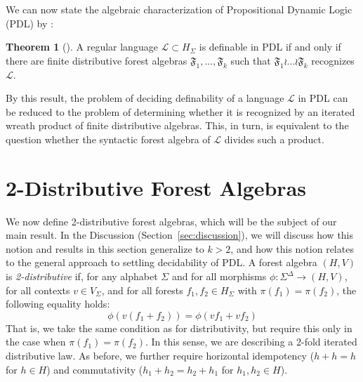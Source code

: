 \documentclass[sigplan,9pt]{acmart}\settopmatter{printfolios=true,printccs=false,printacmref=false}
\newcounter{thm}
\newcounter{theorem}
\theoremstyle{definition}
\newtheorem{theorem}[thm]{Theorem}
\newcommand{\La}[0]{{\mathcal{L}}}
\newcommand{\Ff}[0]{{\mathfrak{F}}}
\begin{document}



We can now state the algebraic characterization of Propositional Dynamic Logic (PDL) by \cite{bojanczyk-wreath-2012}:

\begin{theorem}[\cite{bojanczyk-wreath-2012}]
A regular language $\La \subset H_\Sigma$ is definable in PDL if and only if there are finite distributive forest algebras $\Ff_1, ..., \Ff_k$ such that $\Ff_1 \wr ... \wr \Ff_k$ recognizes $\La$.
\end{theorem}

By this result, the problem of deciding definability of a language $\La$ in PDL can be reduced to the problem of determining whether it is recognized by an iterated wreath product of finite distributive algebras.
This, in turn, is equivalent to the question whether the syntactic forest algebra of $\La$ divides such a product.

\section{2-Distributive Forest Algebras}\label{sec:2-dis}

We now define 2-distributive forest algebras, which will be the subject of our main result.
In the Discussion (Section~\ref{sec:discussion}), we will discuss how this notion and results in this section generalize to $k > 2$, and how this notion relates to the general approach to settling decidability of PDL.
A forest algebra $(H,V)$ is \emph{2-distributive} if, for any alphabet $\Sigma$ and for all morphisms $\phi : \Sigma^\Delta \rightarrow (H,V)$, for all contexts $v \in V_\Sigma$, and for all forests $f_1, f_2 \in H_\Sigma$ with $\pi(f_1) = \pi(f_2)$, the following equality holds:
$$\phi(v(f_1+f_2)) = \phi(vf_1 + vf_2)$$
That is, we take the same condition as for distributivity, but require this only in the case when $\pi(f_1) = \pi(f_2)$.
In this sense, we are describing a 2-fold iterated distributive law.
As before, we further require horizontal idempotency ($h+h = h$ for $h \in H$) and commutativity ($h_1+h_2=h_2+h_1$ for $h_1, h_2 \in H$).
\end{document}
